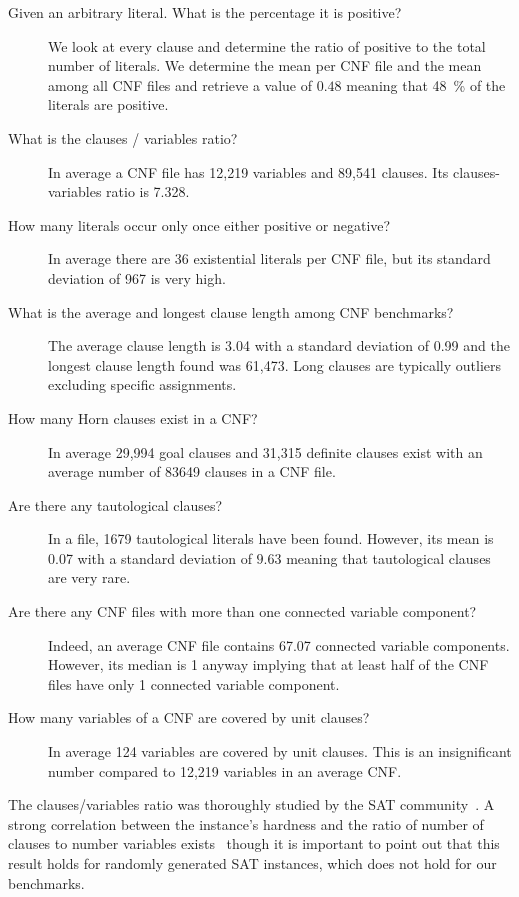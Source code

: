 \begin{description}
\item[Given an arbitrary literal. What is the percentage it is positive?]
  We look at every clause and determine the ratio of positive to the total number of literals.
  We determine the mean per CNF file and the mean among all CNF files
  and retrieve a value of $0.48$ meaning that 48~\% of the literals are positive.
\item[What is the clauses / variables ratio?]
  In average a CNF file has 12,219 variables and 89,541 clauses.
  Its clauses-variables ratio is 7.328.
\item[How many literals occur only once either positive or negative?]
  In average there are 36 existential literals per CNF file,
  but its standard deviation of 967 is very high.
\item[What is the average and longest clause length among CNF benchmarks?]
  The average clause length is 3.04 with a standard deviation of 0.99
  and the longest clause length found was 61,473. Long clauses are typically
  outliers excluding specific assignments.
\item[How many Horn clauses exist in a CNF?]
  In average 29,994 goal clauses and 31,315 definite clauses exist
  with an average number of 83649 clauses in a CNF file.
\item[Are there any tautological clauses?]
  In a file, 1679 tautological literals have been found. However,
  its mean is 0.07 with a standard deviation of $9.63$ meaning that tautological
  clauses are very rare.
\item[Are there any CNF files with more than one connected variable component?]
  Indeed, an average CNF file contains 67.07 connected variable components.
  However, its median is 1 anyway implying that at least half of the CNF files
  have only 1 connected variable component.
\item[How many variables of a CNF are covered by unit clauses?]
  In average 124 variables are covered by unit clauses. This is an insignificant
  number compared to 12,219 variables in an average CNF.
\end{description}

The clauses/variables ratio was thoroughly studied by the SAT
community~\cite{nudelman2004understanding}.
A strong correlation between the instance's hardness and the ratio of number
of clauses to number variables exists~\cite{selman1996generating}
though it is important to point out that this result holds for randomly
generated SAT instances, which does not hold for our benchmarks.

